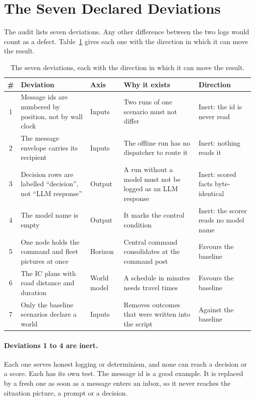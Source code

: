 \section{The Seven Declared Deviations}
\label{sec:val:deviations}

The audit lists seven deviations. Any other difference between the two logs
would count as a defect. Table~\ref{tab:val:deviations} gives each one with the
direction in which it can move the result.

\begin{table}[htbp]
\centering
\caption{The seven deviations, each with the direction in which it can move
the result.}
\label{tab:val:deviations}
\small
\begin{tabularx}{\textwidth}{c>{\raggedright\arraybackslash}X>{\raggedright\arraybackslash}p{1.6cm}>{\raggedright\arraybackslash}X>{\raggedright\arraybackslash}p{2.6cm}}
\toprule
\# & Deviation & Axis & Why it exists & Direction \\
\midrule
1 & Message ids are numbered by position, not by wall clock & Inputs & Two runs of one scenario must not differ & Inert: the id is never read \\
2 & The message envelope carries its recipient & Inputs & The offline run has no dispatcher to route it & Inert: nothing reads it \\
3 & Decision rows are labelled ``decision'', not ``LLM response'' & Output & A run without a model must not be logged as an LLM response & Inert: scored facts byte-identical \\
4 & The model name is empty & Output & It marks the control condition & Inert: the scorer reads no model name \\
5 & One node holds the command and fleet pictures at once & Horizon & Central command consolidates at the command post & Favours the baseline \\
6 & The IC plans with road distance and duration & World model & A schedule in minutes needs travel times & Favours the baseline \\
7 & Only the baseline scenarios declare a world & Inputs & Removes outcomes that were written into the script & Against the baseline \\
\bottomrule
\end{tabularx}
\end{table}

\paragraph{Deviations 1 to 4 are inert.} Each one serves honest logging or
determinism, and none can reach a decision or a score. Each has its own test.
The message id is a good example. It is replaced by a fresh one as soon as a
message enters an inbox, so it never reaches the situation picture, a prompt
or a decision.

